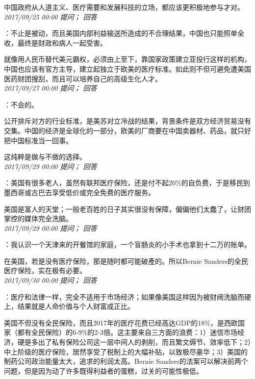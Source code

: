 \documentclass[twocolumn]{ctexart}
\begin{document}
中国政府从人道主义、医疗需要和发展科技的立场，都应该更积极地参与才对。\\

\textit{\hfill\noindent\small 2017/09/25 00:00 提问； 回答}

：不止是被动，而且美国内部利益输送所造成的不合理结果，中国也只能照单全收，最终是财政和病人一起受害。

就像用人民币替代美元霸权，必须由上至下，靠国家政策建立亚投行这样的机构，中国也应该有官方主导，建立起独立于欧美的医疗标准。如此则不但可避免遭美国医药财团搜刮，而且可以培养自己的高级生化人才。\\

\textit{\hfill\noindent\small 2017/09/27 00:00 提问； 回答}

：不会的。

公开排斥对方的行业标准，是美苏对立冷战的结果，背景条件是双方经济贸易没有交集。中国的经济是全球化的一部分，欧美的厂商要在中国卖器材、药品，就只好把中国标准当一回事。

这纯粹是做与不做的选择。\\

\textit{\hfill\noindent\small 2017/09/29 00:00 提问； 回答}

：美国有很多老人，虽然有联邦医疗保险，还是付不起20\%的自负费，于是移民到墨西哥或古巴去享受低价或完全免费的医疗服务。

美国是富人的天堂；一般老百姓的日子其实很没有保障，偏偏他们太蠢了，让财团掌控的媒体完全洗脑。\\

\textit{\hfill\noindent\small 2017/09/29 00:00 提问； 回答}

：我认识一个天津来的开餐馆的家庭，一个盲肠炎的小手术也拿到十二万的账单。

在美国，若是没有医疗保险，那是随时都可能破產的。所以Bernie Sanders的全民医疗保险，实在极有必要。\\

\textit{\hfill\noindent\small 2017/09/30 00:00 提问； 回答}

：医疗和法律一样，完全不适用于市场经济；如果像美国这样因为被财阀洗脑而硬上，结果就是人命价值与个人财富成正比。

美国不但没有全民保险，而且2017年的医疗花费已经高达GDP的18\%，是西欧国家（都有全民保险）的6-9\%的2-3倍。这主要来自三方面的浪费：1）迷信市场经济，硬是多出了私有保险公司这一层中间人的剥削，而且繁文缛节、效率低下；2）中上阶级的医疗保险，居然享受了税制上的大幅补贴，以致极尽豪华；3）美国的制药公司政治能量太大，追求的利润太高。Bernie Sanders的法案可以解决前两个问题，但是因为动了许多既得利益者的蛋糕，过关的可能性极低。
\end{document}
